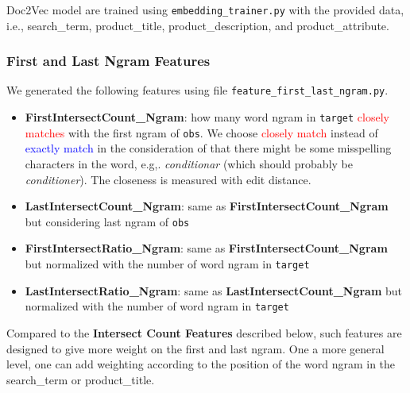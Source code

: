 \documentclass[12pt]{article}
\begin{document}
Doc2Vec model are trained using \texttt{embedding\_trainer.py} with the provided data, i.e., search\_term, product\_title, product\_description, and product\_attribute.

\subsubsection{First and Last Ngram Features}
\label{subsubsec:Feature:Chenglong:First_Last_Ngram}
We generated the following features using file \texttt{feature\_first\_last\_ngram.py}.
\begin{itemize}
\item \textbf{FirstIntersectCount\_Ngram}: how many word ngram in \texttt{target} \textcolor{red}{closely matches} with the first ngram of \texttt{obs}. We choose \textcolor{red}{closely match} instead of \textcolor{blue}{exactly match} in the consideration of that there might be some misspelling characters in the word, e.g,. \emph{conditionar} (which should probably be \emph{conditioner}). The closeness is measured with edit distance.
\item \textbf{LastIntersectCount\_Ngram}: same as \textbf{FirstIntersectCount\_Ngram} but considering last ngram of \texttt{obs}
\item \textbf{FirstIntersectRatio\_Ngram}: same as \textbf{FirstIntersectCount\_Ngram} but normalized with the number of word ngram in \texttt{target}
\item \textbf{LastIntersectRatio\_Ngram}: same as \textbf{LastIntersectCount\_Ngram} but normalized with the number of word ngram in \texttt{target}
\end{itemize}
Compared to the \textbf{Intersect Count Features} described below, such features are designed to give more weight on the first and last ngram. One a more general level, one can add weighting according to the position of the word ngram in the search\_term or product\_title.
\end{document}

